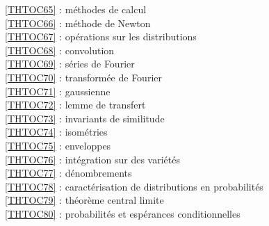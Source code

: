 \ref {THTOC65} : méthodes de calcul\\
\ref {THTOC66} : méthode de Newton\\
\ref {THTOC67} : opérations sur les distributions\\
\ref {THTOC68} : convolution\\
\ref {THTOC69} : séries de Fourier\\
\ref {THTOC70} : transformée de Fourier\\
\ref {THTOC71} : gaussienne\\
\ref {THTOC72} : lemme de transfert\\
\ref {THTOC73} : invariants de similitude\\
\ref {THTOC74} : isométries\\
\ref {THTOC75} : enveloppes\\
\ref {THTOC76} : intégration sur des variétés\\
\ref {THTOC77} : dénombrements\\
\ref {THTOC78} : caractérisation de distributions en probabilités\\
\ref {THTOC79} : théorème central limite\\
\ref {THTOC80} : probabilités et espérances conditionnelles\\
